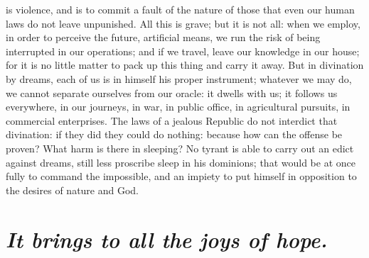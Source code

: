 \documentclass[12pt]{article}
\begin{document}
is violence, and is to commit a fault of the nature of those that even our
human laws do not leave unpunished. All this is grave; but it is not all: when
we employ, in order to perceive the future, artificial means, we run the risk
of being interrupted in our operations; and if we travel, leave our knowledge
in our house; for it is no little matter to pack up this thing and carry it
away. But in divination by dreams, each of us is in himself his proper
instrument; whatever we may do, we cannot separate ourselves from our oracle:
it dwells with us; it follows us everywhere, in our journeys, in war, in public
office, in agricultural pursuits, in commercial enterprises. The laws of a
jealous Republic do not interdict that divination: if they did they could do
nothing: because how can the offense be proven? What harm is there in sleeping?
No tyrant is able to carry out an edict against dreams, still less proscribe
sleep in his dominions; that would be at once fully to command the impossible,
and an impiety to put himself in opposition to the desires of nature and God.


\section{\mdseries\itshape It brings to all the joys of hope.}
\end{document}
